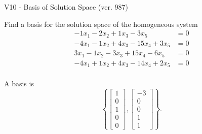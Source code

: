 \begin{exercise}
  \begin{exerciseTitle}V10 - Basis of Solution Space (ver. 987)\end{exerciseTitle}
  \begin{exerciseStatement}
    Find a basis for the solution space of the homogeneous system 
\begin{align*}
 -1 x_ 1 -2 x_ 2 + 1 x_ 3 -3 x_ 5 &= 0  \\ 
  -4 x_ 1 -1 x_ 2 + 4 x_ 3 -15 x_ 4 + 3 x_ 5 &= 0  \\ 
  3 x_ 1 -1 x_ 2 -3 x_ 3 + 15 x_ 4 -6 x_ 5 &= 0  \\ 
  -4 x_ 1 + 1 x_ 2 + 4 x_ 3 -14 x_ 4 + 2 x_ 5 &= 0  \\ 
 \end{align*}


 
  \end{exerciseStatement}

  \begin{exerciseAnswer}
   A basis is   
\[\left\{\left[\begin{array}{c}
1 \\
0 \\
1 \\
0 \\
0
\end{array}\right] , \left[\begin{array}{c}
-3 \\
0 \\
0 \\
1 \\
1
\end{array}\right]\right\}.\]

  


  \end{exerciseAnswer}
\end{exercise}